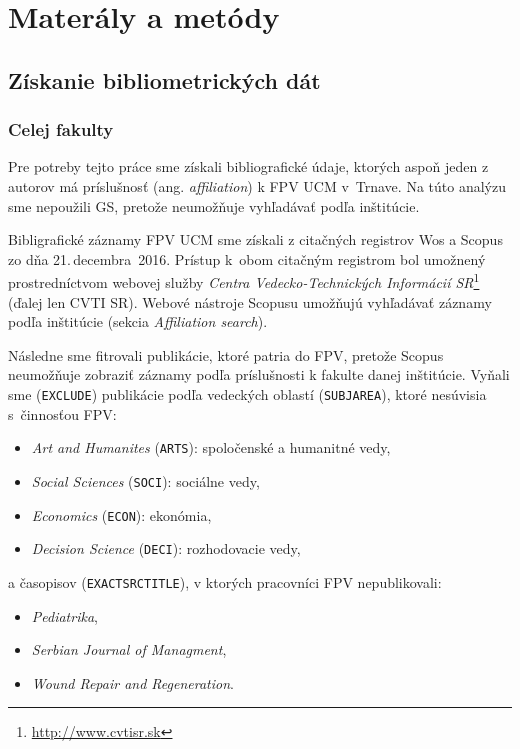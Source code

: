 \chapter{Materály a metódy}

\section{Získanie bibliometrických dát}

\subsection{Celej fakulty}
\label{sec:mine.department}

Pre potreby tejto práce sme získali bibliografické údaje, ktorých aspoň jeden z
autorov má príslušnosť (ang. \emph{affiliation}) k FPV UCM v~Trnave. Na túto
analýzu sme nepoužili GS, pretože neumožňuje vyhľadávať podľa inštitúcie.

Bibligrafické záznamy FPV UCM sme získali z citačných registrov
Wos a Scopus zo dňa 21.\,decembra~2016.  Prístup k~obom citačným registrom bol
umožnený prostredníctvom webovej služby \emph{Centra Vedecko-Technických
Informácií SR}\footnote{\url{http://www.cvtisr.sk}} (ďalej len CVTI SR).  Webové nástroje Scopusu
umožňujú vyhľadávať záznamy podľa inštitúcie (sekcia \emph{Affiliation search}).

Následne sme fitrovali publikácie, ktoré patria do FPV, pretože Scopus
neumožňuje zobraziť záznamy podľa príslušnosti k fakulte danej inštitúcie.
Vyňali sme (\texttt{EXCLUDE}) publikácie podľa vedeckých oblastí
(\texttt{SUBJAREA}), ktoré nesúvisia s~činnosťou FPV:

\begin{itemize}
  \item \emph{Art and Humanites} (\texttt{ARTS}): spoločenské a humanitné vedy,
  \item \emph{Social Sciences} (\texttt{SOCI}): sociálne vedy,
  \item \emph{Economics} (\texttt{ECON}): ekonómia,
  \item \emph{Decision Science} (\texttt{DECI}): rozhodovacie vedy,
\end{itemize}
a časopisov (\texttt{EXACTSRCTITLE}), v ktorých pracovníci FPV nepublikovali:

\begin{itemize}
  \item \emph{Pediatrika}, 
  \item \emph{Serbian Journal of Managment}, 
  \item \emph{Wound Repair and Regeneration}.
\end{itemize}

